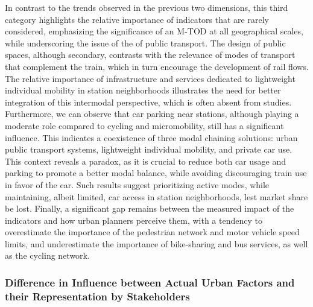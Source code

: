 \begin{refsegment}
In contrast to the trends observed in the previous two dimensions, this third category highlights the relative importance of indicators that are rarely considered, emphasizing the significance of an \acrshort{M-TOD} at all geographical scales, while underscoring the issue of the  of public transport. The design of public spaces, although secondary, contrasts with the relevance of modes of transport that complement the train, which in turn encourage the development of rail flows. The relative importance of infrastructure and services dedicated to lightweight individual mobility in station neighborhoods illustrates the need for better integration of this intermodal perspective, which is often absent from studies. Furthermore, we can observe that car parking near stations, although playing a moderate role compared to cycling and micromobility, still has a significant influence. This indicates a coexistence of three modal chaining solutions: urban public transport systems, lightweight individual mobility, and private car use. This context reveals a paradox, as it is crucial to reduce both car usage and parking to promote a better modal balance, while avoiding discouraging train use in favor of the car. Such results suggest prioritizing active modes, while maintaining, albeit limited, car access in station neighborhoods, lest market share be lost. Finally, a significant gap remains between the measured impact of the indicators and how urban planners perceive them, with a tendency to overestimate the importance of the pedestrian network and motor vehicle speed limits, and underestimate the importance of bike-sharing and bus services, as well as the cycling network.%

\subsubsection*{Difference in Influence between Actual Urban Factors and their Representation by Stakeholders
    \label{chap6:results-ecarts-influence-indicateurs}
    }


\end{refsegment}
